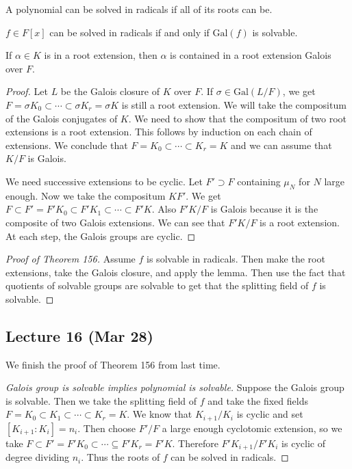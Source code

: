 \message{ !name(notes.tex)}\documentclass[10pt, twoside]{article}
\begin{document}
        \begin{defn}
            A polynomial can be solved in radicals if all of its roots can be.
        \end{defn}

        \begin{thm}
            $f \in F[x]$ can be solved in radicals if and only if $\mathrm{Gal}(f)$ is solvable.
        \end{thm}

        \begin{lem}
            If $\alpha \in K$ is in a root extension, then $\alpha$ is contained in a root extension Galois over $F$.
            \begin{proof}
                Let $L$ be the Galois closure of $K$ over $F$. If $\sigma \in \mathrm{Gal}(L/F)$, we get $F = \sigma K_0 \subset \cdots \subset \sigma K_r = \sigma K$ is still a root extension. We will take the compositum of the Galois conjugates of $K$. We need to show that the compositum of two root extensions is a root extension. This follows by induction on each chain of extensions. We conclude that $F = K_0 \subset \cdots \subset K_r = K$ and we can assume that $K/F$ is Galois.

                We need successive extensions to be cyclic. Let $F' \supset F$ containing $\mu_N$ for $N$ large enough. Now we take the compositum $KF'$. We get $F \subset F' = F'K_0 \subset F'K_1 \subset \cdots \subset F'K$. Also $F'K/F$ is Galois because it is the composite of two Galois extensions. We can see that $F'K/F$ is a root extension. At each step, the Galois groups are cyclic.
            \end{proof}
        \end{lem}

        \begin{proof}[Proof of Theorem 156]
            Assume $f$ is solvable in radicals. Then make the root extensions, take the Galois closure, and apply the lemma. Then use the fact that quotients of solvable groups are solvable to get that the splitting field of $f$ is solvable.
        \end{proof}

        \subsection{Lecture 16 (Mar 28)}
        We finish the proof of Theorem 156 from last time.

        \begin{proof}[Galois group is solvable implies polynomial is solvable]
            Suppose the Galois group is solvable. Then we take the splitting field of $f$ and take the fixed fields $F = K_0 \subset K_1 \subset \cdots \subset K_r = K$. We know that $K_{i+1}/K_i$ is cyclic and set $[K_{i+1}:K_i] = n_i$. Then choose $F'/F$ a large enough cyclotomic extension, so we take $F \subset F' = F'K_0 \subset \cdots \subseteq F'K_r = F'K$. Therefore $F'K_{i+1}/F'K_i$ is cyclic of degree dividing $n_i$. Thus the roots of $f$ can be solved in radicals.
        \end{proof}
\end{document}
